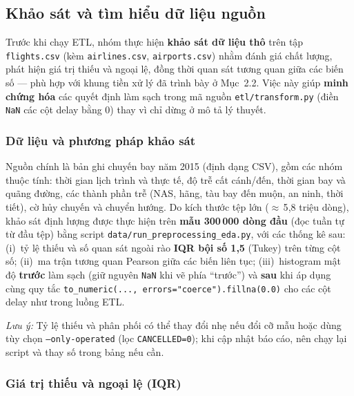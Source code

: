 \subsection{Khảo sát và tìm hiểu dữ liệu nguồn}
\label{subsec:eda_source}

Trước khi chạy ETL, nhóm thực hiện \textbf{khảo sát dữ liệu thô} trên tập \texttt{flights.csv}
(kèm \texttt{airlines.csv}, \texttt{airports.csv}) nhằm đánh giá chất lượng, phát hiện giá trị thiếu
và ngoại lệ, đồng thời quan sát tương quan giữa các biến số --- phù hợp với khung tiền xử lý
đã trình bày ở Mục~2.2. Việc này giúp \textbf{minh chứng hóa} các quyết định làm sạch trong mã nguồn
\texttt{etl/transform.py} (điền \texttt{NaN} các cột delay bằng 0) thay vì chỉ dừng ở mô tả lý thuyết.

\subsubsection{Dữ liệu và phương pháp khảo sát}

Nguồn chính là bản ghi chuyến bay năm 2015 (định dạng CSV), gồm các nhóm thuộc tính:
thời gian lịch trình và thực tế, độ trễ cất cánh/đến, thời gian bay và quãng đường,
các thành phần trễ (NAS, hãng, tàu bay đến muộn, an ninh, thời tiết), cờ hủy chuyến và chuyển hướng.
Do kích thước tệp lớn ($\approx$\,5{,}8 triệu dòng), khảo sát định lượng được thực hiện trên
\textbf{mẫu 300\,000 dòng đầu} (đọc tuần tự từ đầu tệp) bằng script
\texttt{data/run\_preprocessing\_eda.py}, với các thống kê sau:
(i)~tỷ lệ thiếu và số quan sát ngoài rào \textbf{IQR bội số 1{,}5} (Tukey) trên từng cột số;
(ii)~ma trận tương quan Pearson giữa các biến liên tục;
(iii)~histogram mật độ \textbf{trước} làm sạch (giữ nguyên \texttt{NaN} khi vẽ phía ``trước'') và
\textbf{sau} khi áp dụng cùng quy tắc \texttt{to\_numeric(..., errors="coerce").fillna(0.0)}
cho các cột delay như trong luồng ETL.

\textit{Lưu ý:} Tỷ lệ thiếu và phân phối có thể thay đổi nhẹ nếu đổi cỡ mẫu hoặc dùng tùy chọn
\texttt{--only-operated} (lọc \texttt{CANCELLED=0}); khi cập nhật báo cáo, nên chạy lại script và
thay số trong bảng nếu cần.

\subsubsection{Giá trị thiếu và ngoại lệ (IQR)}


